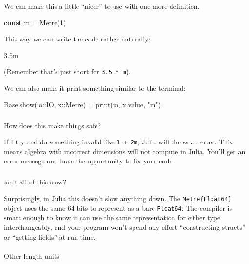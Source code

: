 \documentclass[
]{article}
\makeatletter
\let\oldparagraph\paragraph
\renewcommand{\paragraph}{
    \@ifstar
      \xxxParagraphStar
      \xxxParagraphNoStar
  }
\newcommand{\xxxParagraphStar}[1]{\oldparagraph*{#1}\mbox{}}
\newcommand{\xxxParagraphNoStar}[1]{\oldparagraph{#1}\mbox{}}
\let\oldsubparagraph\subparagraph
\renewcommand{\subparagraph}{
    \@ifstar
      \xxxSubParagraphStar
      \xxxSubParagraphNoStar
  }
\newcommand{\xxxSubParagraphStar}[1]{\oldsubparagraph*{#1}\mbox{}}
\newcommand{\xxxSubParagraphNoStar}[1]{\oldsubparagraph{#1}\mbox{}}
\newenvironment{Shaded}{\begin{snugshade}}{\end{snugshade}}
\newcommand{\BuiltInTok}[1]{\textcolor[rgb]{0.00,0.23,0.31}{#1}}
\newcommand{\DataTypeTok}[1]{\textcolor[rgb]{0.68,0.00,0.00}{#1}}
\newcommand{\FloatTok}[1]{\textcolor[rgb]{0.68,0.00,0.00}{#1}}
\newcommand{\FunctionTok}[1]{\textcolor[rgb]{0.28,0.35,0.67}{#1}}
\newcommand{\KeywordTok}[1]{\textcolor[rgb]{0.00,0.23,0.31}{\textbf{#1}}}
\newcommand{\NormalTok}[1]{\textcolor[rgb]{0.00,0.23,0.31}{#1}}
\newcommand{\OperatorTok}[1]{\textcolor[rgb]{0.37,0.37,0.37}{#1}}
\newcommand{\StringTok}[1]{\textcolor[rgb]{0.13,0.47,0.30}{#1}}
\makeatother
\begin{document}
We can make this a little ``nicer'' to use with one more definition.

\begin{Shaded}
\begin{Highlighting}[]
\KeywordTok{const}\NormalTok{ m }\OperatorTok{=} \FunctionTok{Metre}\NormalTok{(}\FloatTok{1}\NormalTok{)}
\end{Highlighting}
\end{Shaded}

This way we can write the code rather naturally:

\begin{Shaded}
\begin{Highlighting}[]
\FloatTok{3.5}\NormalTok{m}
\end{Highlighting}
\end{Shaded}

(Remember that's just short for \texttt{3.5\ *\ m}).

We can also make it print something similar to the terminal:

\begin{Shaded}
\begin{Highlighting}[]
\BuiltInTok{Base}\NormalTok{.}\FunctionTok{show}\NormalTok{(io}\OperatorTok{::}\DataTypeTok{IO}\NormalTok{, x}\OperatorTok{::}\DataTypeTok{Metre}\NormalTok{) }\OperatorTok{=} \FunctionTok{print}\NormalTok{(io, x.value, }\StringTok{"m"}\NormalTok{)}
\end{Highlighting}
\end{Shaded}

\subparagraph{How does this make things
safe?}\label{how-does-this-make-things-safe}

If I try and do something invalid like \texttt{1\ +\ 2m}, Julia will
throw an error. This means algebra with incorrect dimensions will not
compute in Julia. You'll get an error message and have the opportunity
to fix your code.

\subparagraph{Isn't all of this slow?}\label{isnt-all-of-this-slow}

Surprisingly, in Julia this doesn't slow anything down. The
\texttt{Metre\{Float64\}} object uses the same 64 bits to represent as a
bare \texttt{Float64}. The compiler is smart enough to know it can use
the same representation for either type interchangeably, and your
program won't spend any effort ``constructing structs'' or ``getting
fields'' at run time.

\paragraph{Other length units}\label{other-length-units}
\end{document}
